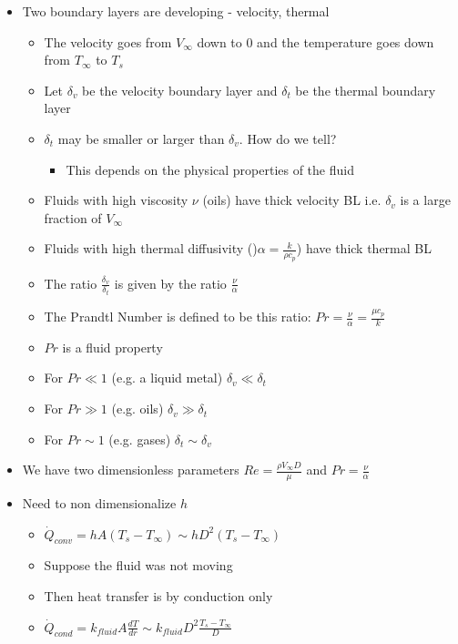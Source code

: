 \documentclass[12pt]{article}
\begin{document}
\begin{itemize}
\begin{itemize}
    \end{itemize}
    \item Two boundary layers are developing - velocity, thermal \begin{itemize}
        \item The velocity goes from $V_{\infty}$ down to $0$ and the temperature goes down from $T_{\infty}$ to $T_s$
        \item Let $\delta_v$ be the velocity boundary layer and $\delta_t$ be the thermal boundary layer
        \item $\delta_t$ may be smaller or larger than $\delta_v$. How do we tell? \begin{itemize}
            \item This depends on the physical properties of the fluid
        \end{itemize}
        \item Fluids with high viscosity $\nu$ (oils) have thick velocity BL i.e. $\delta_v$ is a large fraction of $V_{\infty}$
        \item Fluids with high thermal diffusivity ()$\alpha = \frac{k}{\rho c_p}$) have thick thermal BL
        \item The ratio $\frac{\delta_v}{\delta_t}$ is given by the ratio $\frac{\nu}{\alpha}$
        \item The Prandtl Number is defined to be this ratio: $Pr = \frac{\nu}{\alpha} = \frac{\mu c_p}{k}$
        \item $Pr$ is a fluid property
        \item For $Pr \ll 1$ (e.g. a liquid metal) $\delta_v \ll \delta_t$
        \item For $Pr \gg 1$ (e.g. oils) $\delta_v \gg \delta_t$
        \item For $Pr \sim 1$ (e.g. gases) $\delta_t \sim \delta_v$
    \end{itemize}
    \item We have two dimensionless parameters $Re = \frac{\rho V_{\infty} D}{\mu}$ and $Pr = \frac{\nu}{\alpha}$
    \item Need to non dimensionalize $h$ \begin{itemize}
        \item $\dot{Q}_{conv} = hA (T_s - T_{\infty}) \sim hD^2 (T_s - T_{\infty})$
        \item Suppose the fluid was not moving
        \item Then heat transfer is by conduction only
        \item $\dot{Q}_{cond} = k_{fluid} A \frac{dT}{dr} \sim k_{fluid} D^2 \frac{T_s - T_{\infty}}{D}$

\end{itemize}
\end{itemize}
\end{document}

